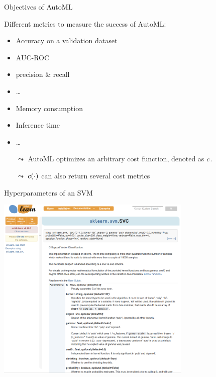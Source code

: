 \begin{frame}[c]{Objectives of AutoML}

Different metrics to measure the success of AutoML:

\begin{itemize}
	\item Accuracy on a validation dataset
	\pause
	\item AUC-ROC
	\pause
	\item precision \& recall
	\item \ldots
	\pause
	\item Memory consumption
	\item Inference time
	\item \ldots
\end{itemize}

\pause
\medskip

\begin{itemize}
	\item[$\leadsto$] AutoML optimizes an arbitrary cost function, denoted as $c$.
	\pause
	\item[$\leadsto$] $c(\cdot)$ can also return several cost metrics
\end{itemize}


\end{frame}
\begin{frame}[c]{Hyperparameters of an SVM}

\centering
\includegraphics[width=0.7\textwidth]{images/sklearn_svm_doc.png}

\end{frame}
